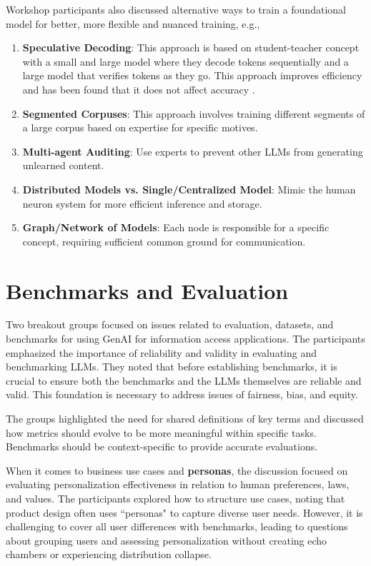 \documentclass[11pt,dvipdfm]{article}
\begin{document}
Workshop participants also discussed alternative ways to train a foundational model for better, more flexible and nuanced training, e.g.,

\begin{enumerate}
    \item {\bf Speculative Decoding}: This approach is based on student-teacher concept with a small and large model where they decode tokens sequentially and a large model that verifies tokens as they go. This approach improves efficiency and has been found that it does not affect accuracy \cite{leviathan2023fast}.%
    \item {\bf Segmented Corpuses}: This approach involves training different segments of a large corpus based on expertise for specific motives.
    \item {\bf Multi-agent Auditing}: Use experts to prevent other LLMs from generating unlearned content.
    \item {\bf Distributed Models vs. Single/Centralized Model}: Mimic the human neuron system for more efficient inference and storage.
    \item{\bf Graph/Network of Models}: Each node is responsible for a specific concept, requiring sufficient common ground for communication.
\end{enumerate}

\section{Benchmarks and Evaluation}
Two breakout groups focused on issues related to evaluation, datasets, and benchmarks for using GenAI for information access applications. The participants emphasized the importance of reliability and validity in evaluating and benchmarking LLMs. They noted that before establishing benchmarks, it is crucial to ensure both the benchmarks and the LLMs themselves are reliable and valid. This foundation is necessary to address issues of fairness, bias, and equity.

The groups highlighted the need for shared definitions of key terms and discussed how metrics should evolve to be more meaningful within specific tasks. Benchmarks should be context-specific to provide accurate evaluations.

When it comes to business use cases and {\bf personas}, the discussion focused on evaluating personalization effectiveness in relation to human preferences, laws, and values. The participants explored how to structure use cases, noting that product design often uses ``personas" to capture diverse user needs. However, it is challenging to cover all user differences with benchmarks, leading to questions about grouping users and assessing personalization without creating echo chambers or experiencing distribution collapse.
\end{document}
